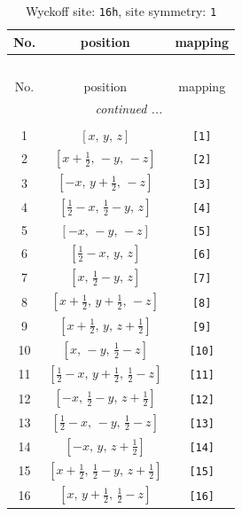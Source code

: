 \documentclass[fleqn,8pt]{jsarticle}
\begin{document}
\begin{longtable}{ccc}
\caption{Wyckoff site: {\tt 16h}, site symmetry: {\tt 1}}
 \\
 \hline \hline
No. & position & mapping \\ \hline \endfirsthead

\multicolumn{2}{l}{\tablename\ \thetable{}} \\
 \hline \hline
No. & position & mapping \\ \hline \endhead

 \hline \hline
\multicolumn{2}{r}{\footnotesize\it continued ...} \\ \endfoot

 \hline \hline
\multicolumn{2}{r}{} \\ \endlastfoot

1 & $\left[ x,\, y,\, z \right]$ & {\tt [1]} \\ \hline
2 & $\left[ x + \frac{1}{2},\, - y,\, - z \right]$ & {\tt [2]} \\ \hline
3 & $\left[ - x,\, y + \frac{1}{2},\, - z \right]$ & {\tt [3]} \\ \hline
4 & $\left[ \frac{1}{2} - x,\, \frac{1}{2} - y,\, z \right]$ & {\tt [4]} \\ \hline
5 & $\left[ - x,\, - y,\, - z \right]$ & {\tt [5]} \\ \hline
6 & $\left[ \frac{1}{2} - x,\, y,\, z \right]$ & {\tt [6]} \\ \hline
7 & $\left[ x,\, \frac{1}{2} - y,\, z \right]$ & {\tt [7]} \\ \hline
8 & $\left[ x + \frac{1}{2},\, y + \frac{1}{2},\, - z \right]$ & {\tt [8]} \\ \hline
9 & $\left[ x + \frac{1}{2},\, y,\, z + \frac{1}{2} \right]$ & {\tt [9]} \\ \hline
10 & $\left[ x,\, - y,\, \frac{1}{2} - z \right]$ & {\tt [10]} \\ \hline
11 & $\left[ \frac{1}{2} - x,\, y + \frac{1}{2},\, \frac{1}{2} - z \right]$ & {\tt [11]} \\ \hline
12 & $\left[ - x,\, \frac{1}{2} - y,\, z + \frac{1}{2} \right]$ & {\tt [12]} \\ \hline
13 & $\left[ \frac{1}{2} - x,\, - y,\, \frac{1}{2} - z \right]$ & {\tt [13]} \\ \hline
14 & $\left[ - x,\, y,\, z + \frac{1}{2} \right]$ & {\tt [14]} \\ \hline
15 & $\left[ x + \frac{1}{2},\, \frac{1}{2} - y,\, z + \frac{1}{2} \right]$ & {\tt [15]} \\ \hline
16 & $\left[ x,\, y + \frac{1}{2},\, \frac{1}{2} - z \right]$ & {\tt [16]} \\
\end{longtable}
\end{document}
